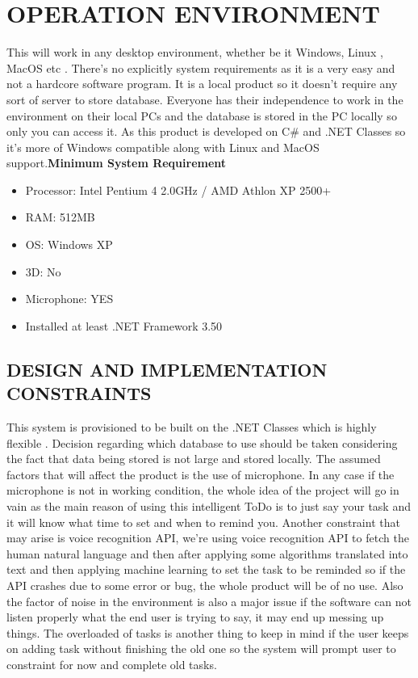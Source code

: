 \documentclass[12pt, a4paper]{report}
\begin{document}
\section{OPERATION ENVIRONMENT }
This will work in any desktop environment, whether be it Windows, Linux , MacOS etc . There’s no explicitly system requirements as it is a very easy and not a hardcore software program. It is a local product so it doesn’t require any sort of server to store database. Everyone has their independence to work in the environment on their local PCs and the database is stored in the PC locally so only you can access it. As this product is developed on C\# and .NET Classes so it’s more of Windows compatible along with Linux and MacOS support.\newline  \newline \textbf{Minimum System Requirement} 
\begin{itemize}
	\item Processor: Intel Pentium 4 2.0GHz / AMD Athlon XP 2500+ 
	\item RAM: 512MB
	\item OS: Windows XP
	\item 3D: No
	\item Microphone: YES 
	\item Installed at least .NET Framework 3.50
\end{itemize}
\begin{center}
\section{DESIGN AND IMPLEMENTATION CONSTRAINTS }
\end{center}
This system is provisioned to be built on the .NET Classes which is highly flexible . Decision regarding which database to use should be taken considering the fact that data being stored is not large and stored locally. \newline The assumed factors that will affect the product is the use of microphone. In any case if the microphone is not in working condition, the whole idea of the project will go in vain as the main reason of using this intelligent ToDo is to just say your task and it will know what time to set and when to remind you. Another constraint that may arise is voice recognition API, we’re using voice recognition API  to fetch the human natural language and then after applying some algorithms translated into text and then applying machine learning to set the task to be reminded so if the API crashes due to some error or bug, the whole product will be of no use. Also the factor of noise in the environment is also a major issue if the software can not listen properly what the end user is trying to say, it may end up messing up things. The overloaded of tasks is another thing to keep in mind if the user keeps on adding task without finishing the old one so the system will prompt user to constraint for now and complete old tasks.
\end{document}
